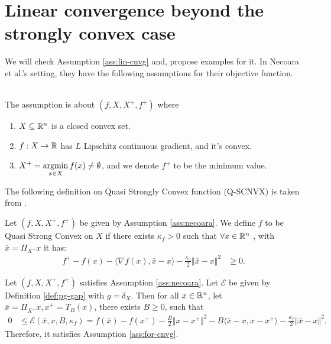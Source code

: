 \documentclass[12pt]{article}
\begin{document}
\section{Linear convergence beyond the strongly convex case}
    We will check Assumption \ref{ass:lin-cnvg} and, propose examples for it.
    In Necoara et al.'s setting, they have the following assumptions for their objective function. 
    \begin{assumption}\;\label{ass:necoara}\\
        The assumption is about $(f, X, X^+, f^+)$ where 
        \begin{enumerate}[nosep]
            \item $X \subseteq \mathbb R^n$ is a closed convex set. 
            \item $f: X\rightarrow \mathbb R$ has $L$ Lipschitz continuous gradient, and it's convex. 
            \item $X^+ = \mathop{\rm argmin}\limits_{x \in X} f(x)\neq \emptyset$, and we denote $f^+$ to be the minimum value. 
        \end{enumerate}
    \end{assumption}
    The following definition on Quasi Strongly Convex function (Q-SCNVX) is taken from \cite[Definition 1]{necoara_linear_2019}. 
    \begin{definition}[Q-SCNVX]\label{def:Q-SCNVX}
        Let $(f, X, X^+, f^+)$ be given by Assumption \ref{ass:necoara}. 
        We define $f$ to be Quasi Strong Convex on $X$ if there exists $\kappa_f  > 0$ such that $\forall x \in \mathbb R^n$ , with $\bar x = \Pi_{X^+}x$ it has:
        \begin{align*}
            f^+ - f(x) - \langle \nabla f(x), \bar x - x\rangle - \frac{\kappa_f}{2}\Vert \bar x - x\Vert^2 
            &\ge 0. 
        \end{align*}
    \end{definition}
    \begin{proposition}\label{prop:qscnvx-ass-ok}
        Let $(f, X, X^+, f^+)$ satisfies Assumption \ref{ass:necoara}.
        Let $\mathcal E$ be given by Definition \ref{def:pg-gap} with $g = \delta_X$. 
        Then for all $x \in \mathbb R^n$, let $\bar x = \Pi_{X^+}x, x^+ = T_B(x)$, there exists $B \ge 0$, such that 
        \begin{align*}
            0 &\le 
            \mathcal E(\bar x, x, B, \kappa_f)
            = 
            f(\bar x) - f(x^+) 
            - \frac{B}{2}\Vert x - x^+\Vert^2 
            - B\langle \bar x - x, x - x^+\rangle
            - \frac{\kappa_f}{2}\Vert \bar x - x\Vert^2. 
        \end{align*}
        Therefore, it satisfies Assumption \ref{ass:for-cnvg}. 
    \end{proposition}
\end{document}
